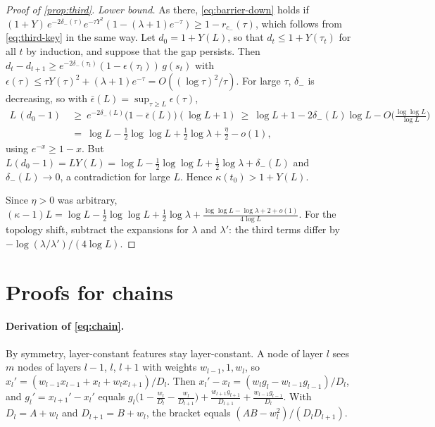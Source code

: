 \begin{proof}[Proof of \cref{prop:third}]
\emph{Lower bound.} As there, \eqref{eq:barrier-down} holds if
$(1+Y)\,e^{-2\delta_-(\tau)}e^{-\tau Y^2}(1-(\lambda+1)e^{-\tau})\ge1-r_{c_-}(\tau)$, which follows from \eqref{eq:third-key} in the same way.
Let $d_0=1+Y(L)$, so that $d_t\le1+Y(\tau_t)$ for all $t$ by induction, and suppose that the gap persists. Then
$d_t-d_{t+1}\ge e^{-2\delta_-(\tau_t)}(1-\epsilon(\tau_t))\,g(s_t)$ with $\epsilon(\tau)\le\tau Y(\tau)^2+(\lambda+1)e^{-\tau}=O((\log\tau)^2/\tau)$.
For large $\tau$, $\delta_-$ is decreasing, so with $\bar\epsilon(L)=\sup_{\tau\ge L}\epsilon(\tau)$,
\begin{align*}
L\,(d_0-1)&\ \ge\ e^{-2\delta_-(L)}\big(1-\bar\epsilon(L)\big)(\log L+1)\ \ge\ \log L+1-2\delta_-(L)\log L-O\Big(\frac{\log\log L}{\log L}\Big)\\
&\ =\ \log L-\tfrac12\log\log L+\tfrac12\log\lambda+\frac\eta2-o(1),
\end{align*}
using $e^{-x}\ge1-x$. But $L(d_0-1)=LY(L)=\log L-\frac12\log\log L+\frac12\log\lambda+\delta_-(L)$ and $\delta_-(L)\to0$, a contradiction for
large $L$. Hence $\kappa(t_0)>1+Y(L)$.

Since $\eta>0$ was arbitrary, $(\kappa-1)L=\log L-\frac12\log\log L+\frac12\log\lambda+\frac{\log\log L-\log\lambda+2+o(1)}{4\log L}$. For the
topology shift, subtract the expansions for $\lambda$ and $\lambda'$: the third terms differ by $-\log(\lambda/\lambda')/(4\log L)$.
\end{proof}

\section{Proofs for chains}\label{app:chains}

\paragraph{Derivation of \eqref{eq:chain}.} By symmetry, layer-constant features stay layer-constant. A node of layer $l$ sees $m$ nodes
of layers $l-1$, $l$, $l+1$ with weights $w_{l-1},1,w_l$, so $x_l'=(w_{l-1}x_{l-1}+x_l+w_lx_{l+1})/D_l$. Then
$x_l'-x_l=(w_lg_l-w_{l-1}g_{l-1})/D_l$, and $g_l'=x_{l+1}'-x_l'$ equals
$g_l\big(1-\frac{w_l}{D_l}-\frac{w_l}{D_{l+1}}\big)+\frac{w_{l+1}g_{l+1}}{D_{l+1}}+\frac{w_{l-1}g_{l-1}}{D_l}$. With $D_l=A+w_l$ and
$D_{l+1}=B+w_l$, the bracket equals $(AB-w_l^2)/(D_lD_{l+1})$.

